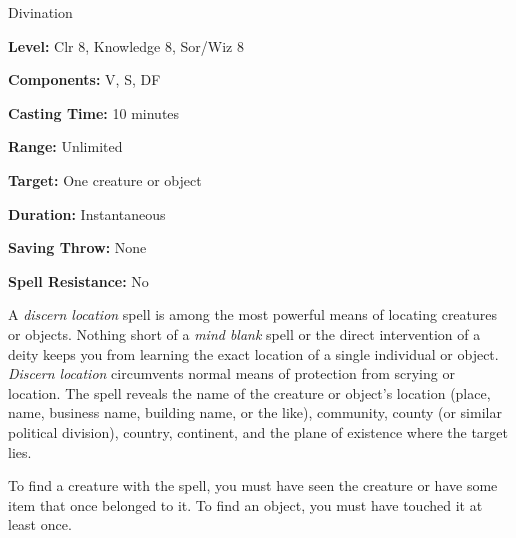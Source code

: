 
Divination

\textbf{Level:} Clr 8, Knowledge 8, Sor/Wiz 8

\textbf{Components:} V, S, DF

\textbf{Casting Time:} 10 minutes

\textbf{Range:} Unlimited

\textbf{Target:} One creature or object

\textbf{Duration:} Instantaneous

\textbf{Saving Throw:} None

\textbf{Spell Resistance:} No

A \textit{discern location} spell is among the most powerful means of locating 
creatures or objects. Nothing short of a \textit{mind blank} spell or the direct 
intervention of a deity keeps you from learning the exact location of a single 
individual or object. \textit{Discern location} circumvents normal means of protection 
from scrying or location. The spell reveals the name of the creature or object's 
location (place, name, business name, building name, or the like), community, county 
(or similar political division), country, continent, and the plane of existence 
where the target lies.

To find a creature with the spell, you must have seen the creature or have some 
item that once belonged to it. To find an object, you must have touched it at least 
once.

